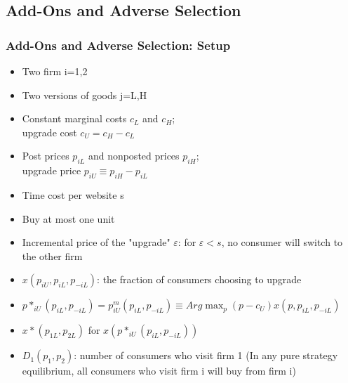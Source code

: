 \documentclass{beamer}
\begin{document}
\subsection{Add-Ons and Adverse Selection}
\begin{frame}[allowframebreaks]
\frametitle{Add-Ons and Adverse Selection: Setup}
\begin{itemize}
\item Two firm i=1,2
\item Two versions of goods j=L,H
\item Constant marginal costs $c_L$ and $c_H$;\\ upgrade cost $c_U=c_H-c_L$
\item Post prices $p_{iL}$ and nonposted prices $p_{iH}$;\\ upgrade price $p_{iU}\equiv p_{iH}-p_{iL}$
\item Time cost per website s
\item Buy at most one unit

\framebreak

\item Incremental price of the "upgrade" $\varepsilon$: for $\varepsilon<s$, no consumer will switch to the other firm
\item $x(p_{iU},p_{iL},p_{-iL})$: the fraction of consumers choosing to upgrade
\item $p*_{iU}(p_{iL},p_{-iL})=p^m_{iU}(p_{iL},p_{-iL})\equiv Arg \max_p (p-c_U)x(p,p_{iL},p_{-iL})$
\item $x*(p_{1L},p_{2L})$ for $x(p*_{iU}(p_{iL},p_{-iL}))$
\item  $D_1(p_1,p_2)$: number of consumers who visit firm 1 (In any pure strategy equilibrium, all consumers who visit firm i will buy from firm i)
\end{itemize}
\end{frame}
\end{document}
